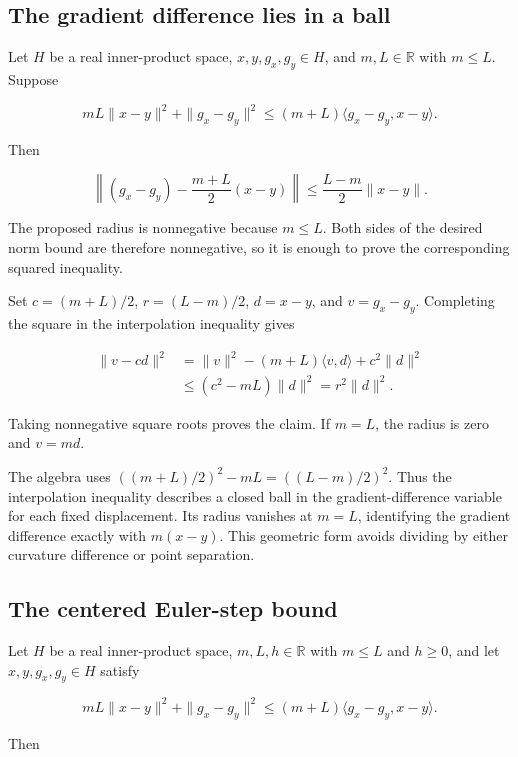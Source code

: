 \documentclass[11pt,a4paper]{article}
\begin{document}
\subsection{\texorpdfstring{The gradient difference lies in a ball}{The gradient difference lies in a ball}}


Let \(H\) be a real inner-product space, \(x,y,g_x,g_y\in H\), and \(m,L\in\mathbb R\) with \(m\le L\). Suppose

\[mL\|x-y\|^2+\|g_x-g_y\|^2\le(m+L)\langle g_x-g_y,x-y\rangle.\]

Then

\[\left\|(g_x-g_y)-\frac{m+L}{2}(x-y)\right\|\le\frac{L-m}{2}\|x-y\|.\]

The proposed radius is nonnegative because \(m\le L\). Both sides of the desired norm bound are therefore nonnegative, so it is enough to prove the corresponding squared inequality.



Set \(c=(m+L)/2\), \(r=(L-m)/2\), \(d=x-y\), and \(v=g_x-g_y\). Completing the square in the interpolation inequality gives

\[\begin{aligned}\|v-cd\|^2&=\|v\|^2-(m+L)\langle v,d\rangle+c^2\|d\|^2\\&\le(c^2-mL)\|d\|^2=r^2\|d\|^2.\end{aligned}\]

Taking nonnegative square roots proves the claim. If \(m=L\), the radius is zero and \(v=md\).



The algebra uses \(((m+L)/2)^2-mL=((L-m)/2)^2\). Thus the interpolation inequality describes a closed ball in the gradient-difference variable for each fixed displacement. Its radius vanishes at \(m=L\), identifying the gradient difference exactly with \(m(x-y)\). This geometric form avoids dividing by either curvature difference or point separation.


\subsection{\texorpdfstring{The centered Euler-step bound}{The centered Euler-step bound}}


Let \(H\) be a real inner-product space, \(m,L,h\in\mathbb R\) with \(m\le L\) and \(h\ge0\), and let \(x,y,g_x,g_y\in H\) satisfy

\[mL\|x-y\|^2+\|g_x-g_y\|^2\le(m+L)\langle g_x-g_y,x-y\rangle.\]

Then
\end{document}
